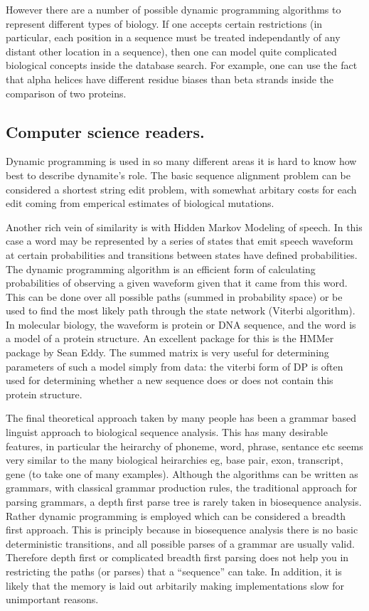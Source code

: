 However there are a number of possible dynamic programming algorithms
to represent different types of biology. If one accepts certain restrictions
(in particular, each position in a sequence must be treated independantly
of any distant other location in a sequence), then one can model quite 
complicated biological concepts inside the database search. For example, one
can use the fact that alpha helices have different residue biases than beta
strands inside the comparison of two proteins. 

\subsection{Computer science readers.}
Dynamic programming is used in so many different areas it is hard to
know how best to describe dynamite's role. The basic sequence
alignment problem can be considered a shortest string edit problem,
with somewhat arbitary costs for each edit coming from emperical
estimates of biological mutations. 

Another rich vein of similarity is with Hidden Markov Modeling of
speech.  In this case a word may be represented by a series of states
that emit speech waveform at certain probabilities and transitions
between states have defined probabilities. The dynamic programming
algorithm is an efficient form of calculating probabilities of
observing a given waveform given that it came from this word. This can
be done over all possible paths (summed in probability space) or be
used to find the most likely path through the state network (Viterbi
algorithm). In molecular biology, the waveform is protein or DNA
sequence, and the word is a model of a protein structure. An 
excellent package for this is the HMMer package by Sean Eddy. The summed
matrix is very useful for determining parameters of such a model
simply from data: the viterbi form of DP is often used for determining
whether a new sequence does or does not contain this protein structure.

The final theoretical approach taken by many people has been a grammar
based linguist approach to biological sequence analysis. This has many
desirable features, in particular the heirarchy of phoneme, word,
phrase, sentance etc seems very similar to the many biological
heirarchies eg, base pair, exon, transcript, gene (to take one of many
examples). Although the algorithms can be written as grammars, with
classical grammar production rules, the traditional approach for
parsing grammars, a depth first parse tree is rarely taken in
biosequence analysis. Rather dynamic programming is employed which can
be considered a breadth first approach. This is principly because 
in biosequence analysis there is no basic deterministic transitions,
and all possible parses of a grammar are usually valid. Therefore depth
first or complicated breadth first parsing does not help you in 
restricting the paths (or parses) that a ``sequence'' can take. In addition,
it is likely that the memory is laid out arbitarily making implementations
slow for unimportant reasons. 

